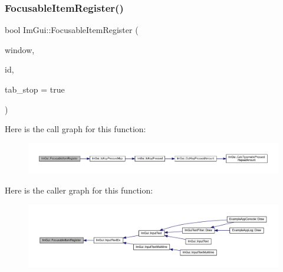 \mbox{\label{namespace_im_gui_ab1e2f7069edbab669b56e93e30930c45}} 
\subsubsection{\texorpdfstring{Focusable\+Item\+Register()}{FocusableItemRegister()}}
{\footnotesize\ttfamily bool Im\+Gui\+::\+Focusable\+Item\+Register (\begin{DoxyParamCaption}\item[{\mbox{\hyperlink{struct_im_gui_window}{Im\+Gui\+Window}} $\ast$}]{window,  }\item[{\mbox{\hyperlink{imgui_8h_a1785c9b6f4e16406764a85f32582236f}{Im\+Gui\+ID}}}]{id,  }\item[{bool}]{tab\+\_\+stop = {\ttfamily true} }\end{DoxyParamCaption})}

Here is the call graph for this function\+:
\nopagebreak
\begin{figure}[H]
\begin{center}
\leavevmode
\includegraphics[width=350pt]{namespace_im_gui_ab1e2f7069edbab669b56e93e30930c45_cgraph}
\end{center}
\end{figure}
Here is the caller graph for this function\+:
\nopagebreak
\begin{figure}[H]
\begin{center}
\leavevmode
\includegraphics[width=350pt]{namespace_im_gui_ab1e2f7069edbab669b56e93e30930c45_icgraph}
\end{center}
\end{figure}
\mbox{\label{namespace_im_gui_a390518fcaef04b4d399d2475d4d84df7}} 
